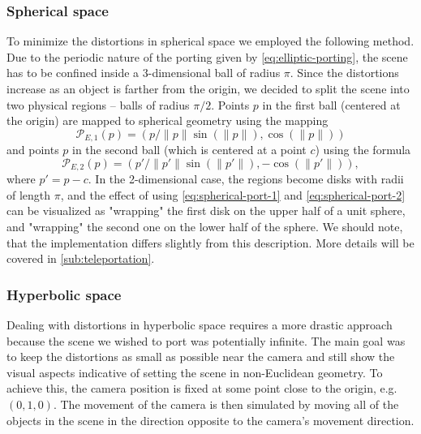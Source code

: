 \subsubsection*{Spherical space}
To minimize the distortions in spherical space we employed the following method.
Due to the periodic nature of the porting given by \autoref{eq:elliptic-porting}, the scene has to be confined inside a 3-dimensional ball of radius $\pi$.
Since the distortions increase as an object is farther from the origin, we decided to split the scene into two physical regions -- balls of radius $\pi / 2$.
Points $p$ in the first ball (centered at the origin) are mapped to spherical geometry using the mapping
\begin{equation} \label{eq:spherical-port-1}
    \mathcal{P}_{E,1}(p) = (p / \lVert p\rVert \sin(\lVert p\rVert), \cos(\lVert p\rVert))
\end{equation}
and points $p$ in the second ball (which is centered at a point $c$) using the formula
\begin{equation}\label{eq:spherical-port-2}
    \mathcal{P}_{E,2}(p) = (p' / \lVert p' \rVert \sin(\lVert p' \rVert), -\cos(\lVert p'\rVert)),
\end{equation}
where $p' = p - c$.
In the 2-dimensional case, the regions become disks with radii of length $\pi$, and the effect of using \autoref{eq:spherical-port-1} and \autoref{eq:spherical-port-2} can be visualized as "wrapping" the first disk on the upper half of a unit sphere, and "wrapping" the second one on the lower half of the sphere.
We should note, that the implementation differs slightly from this description.
More details will be covered in \autoref{sub:teleportation}.

\subsubsection*{Hyperbolic space} \label{subsubsec:practical-considerations-hyperbolic-space}
Dealing with distortions in hyperbolic space requires a more drastic approach because the scene we wished to port was potentially infinite.
The main goal was to keep the distortions as small as possible near the camera and still show the visual aspects indicative of setting the scene in non-Euclidean geometry.
To achieve this, the camera position is fixed at some point close to the origin, e.g. $(0, 1, 0)$.
The movement of the camera is then simulated by moving all of the objects in the scene in the direction opposite to the camera's movement direction.